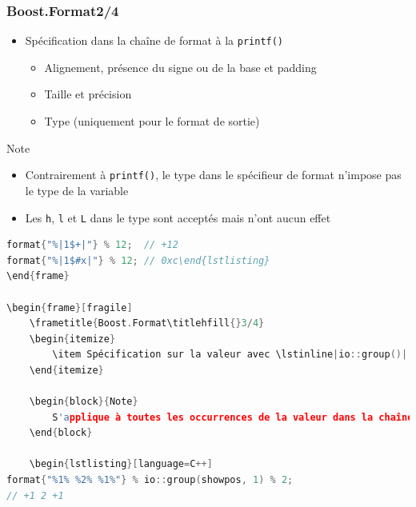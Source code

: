 \documentclass[C++.tex]{subfiles}
\begin{document}
\begin{frame}[fragile]
	\frametitle{Boost.Format\titlehfill{}2/4}
	\begin{itemize}
		\item Spécification dans la chaîne de format à la \lstinline|printf()|
		\begin{itemize}
			\item Alignement, présence du signe ou de la base et padding
			\item Taille et précision
			\item Type (uniquement pour le format de sortie)
		\end{itemize}
	\end{itemize}

	\begin{block}{Note}
		\begin{itemize}
			\item Contrairement à \lstinline|printf()|, le type dans le spécifieur de format n'impose pas le type de la variable
			\item Les \lstinline|h|, \lstinline|l| et \lstinline|L| dans le type sont acceptés mais n'ont aucun effet
		\end{itemize}
	\end{block}

	\begin{lstlisting}[language=C++]
format{"%|1$+|"} % 12;  // +12
format{"%|1$#x|"} % 12;	// 0xc\end{lstlisting}
\end{frame}

\begin{frame}[fragile]
	\frametitle{Boost.Format\titlehfill{}3/4}
	\begin{itemize}
		\item Spécification sur la valeur avec \lstinline|io::group()|
	\end{itemize}

	\begin{block}{Note}
		S'applique à toutes les occurrences de la valeur dans la chaîne
	\end{block}

	\begin{lstlisting}[language=C++]
format{"%1% %2% %1%"} % io::group(showpos, 1) % 2; 
// +1 2 +1\end{lstlisting}
\end{frame}
\end{document}
